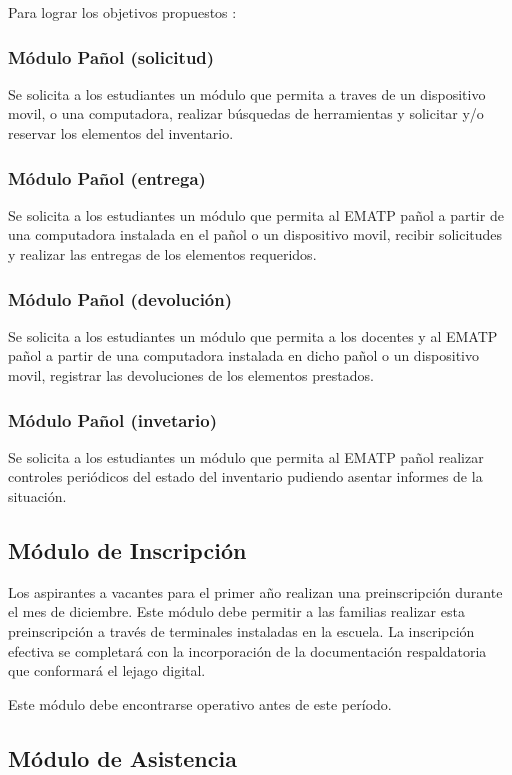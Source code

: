 Para lograr los objetivos propuestos :

\subsubsection{Módulo Pañol (solicitud)}
Se solicita a los estudiantes un módulo que permita a traves de un dispositivo movil, o una computadora, realizar búsquedas de herramientas y solicitar y/o reservar los elementos del inventario.
\subsubsection{Módulo Pañol (entrega)}
Se solicita a los estudiantes un módulo que permita al EMATP pañol a partir de una computadora instalada en el pañol o un dispositivo movil, recibir solicitudes y realizar las entregas de los elementos requeridos.
\subsubsection{Módulo Pañol (devolución)}
Se solicita a los estudiantes un módulo que permita a los docentes y al EMATP pañol a partir de una computadora instalada en dicho pañol o un dispositivo movil, registrar las devoluciones de los elementos prestados.

\subsubsection{Módulo Pañol (invetario)}
Se solicita a los estudiantes un módulo que permita al EMATP pañol realizar controles periódicos del estado del inventario pudiendo asentar informes de la situación.


\subsection{Módulo de Inscripción}

Los aspirantes a vacantes para el primer año realizan una preinscripción durante el mes de diciembre. Este módulo debe permitir a las familias realizar esta preinscripción a través de terminales instaladas en la escuela. La inscripción efectiva se completará con la incorporación de la documentación respaldatoria que conformará el lejago digital.

Este módulo debe encontrarse operativo antes de este período.

\subsection{Módulo de Asistencia}

